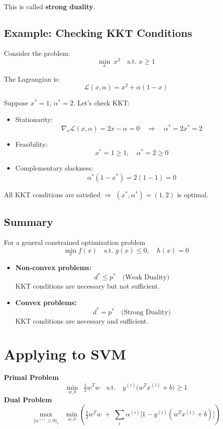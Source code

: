 \documentclass[11pt]{article}
\begin{document}
This is called \textbf{strong duality}.


\subsection*{Example: Checking KKT Conditions}

Consider the problem:
\[
	\min_x \; x^2 \quad \text{s.t. } x \geq 1
\]

The Lagrangian is:
\[
	\mathcal{L}(x, \alpha) = x^2 + \alpha (1 - x)
\]

Suppose $x^* = 1$, $\alpha^* = 2$. Let’s check KKT:

\begin{itemize}
	\item Stationarity:
	      \[
		      \nabla_x \mathcal{L}(x, \alpha) = 2x - \alpha = 0
		      \quad \Rightarrow \quad \alpha^* = 2x^* = 2
	      \]
	\item Feasibility:
	      \[
		      x^* = 1 \geq 1, \quad \alpha^* = 2 \geq 0
	      \]
	\item Complementary slackness:
	      \[
		      \alpha^* (1 - x^*) = 2(1 - 1) = 0
	      \]
\end{itemize}

All KKT conditions are satisfied $\Rightarrow$ $(x^*, \alpha^*) = (1,2)$ is optimal.

\subsection	*{Summary}

For a general constrained optimization problem
\[
	\min_{x} f(x) \quad \text{s.t. } g(x) \leq 0, \quad h(x) = 0
\]

\begin{itemize}
	\item \textbf{Non-convex problems:}
	      \[
		      d^* \leq p^* \quad \text{(Weak Duality)}
	      \]
	      KKT conditions are necessary but not sufficient.

	\item \textbf{Convex problems:}
	      \[
		      d^* = p^* \quad \text{(Strong Duality)}
	      \]
	      KKT conditions are necessary and sufficient.
\end{itemize}

\section*{Applying to SVM}

\textbf{Primal Problem}
\[
	\min_{w,b} \;\; \tfrac{1}{2} w^T w
	\quad \text{s.t.} \quad
	y^{(i)} \big(w^T x^{(i)} + b \big) \geq 1
\]
\textbf{Dual Problem}
\[
	\max_{\{\alpha^{(i)} \geq 0\}_i}
	\;\; \min_{w,b} \left(
	\tfrac{1}{2} w^T w \;+\;
	\sum_i \alpha^{(i)} \Big[1 - y^{(i)} (w^T x^{(i)} + b) \Big]
	\right)
\]
\end{document}
